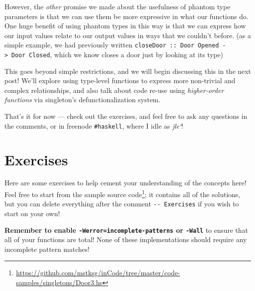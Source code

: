 \documentclass[]{article}
\renewcommand{\href}[2]{#2\footnote{\url{#1}}}
\begin{document}
However, the \emph{other} promise we made about the usefulness of phantom type
parameters is that we can use them be more expressive in what our functions do.
One huge benefit of using phantom types in this way is that we can express how
our input values relate to our output values in ways that we couldn't before.
(as a simple example, we had previously written
\texttt{closeDoor\ ::\ Door\ \textquotesingle{}Opened\ -\textgreater{}\ Door\ \textquotesingle{}Closed},
which we know closes a door just by looking at its type)

This goes beyond simple restrictions, and we will begin discussing this in the
next post! We'll explore using type-level functions to express more non-trivial
and complex relationships, and also talk about code re-use using
\emph{higher-order functions} via singleton's defunctionalization system.

That's it for now --- check out the exercises, and feel free to ask any
questions in the comments, or in freenode \texttt{\#haskell}, where I idle as
\emph{jle`}!

\hypertarget{exercises}{%
\section{Exercises}\label{exercises}}

Here are some exercises to help cement your understanding of the concepts here!
Feel free to start from
\href{https://github.com/mstksg/inCode/tree/master/code-samples/singletons/Door3.hs}{the
sample source code}; it contains all of the solutions, but you can delete
everything after the comment \texttt{-\/-\ Exercises} if you wish to start on
your own!

\textbf{Remember to enable \texttt{-Werror=incomplete-patterns} or
\texttt{-Wall}} to ensure that all of your functions are total! None of these
implementations should require any incomplete pattern matches!
\end{document}
